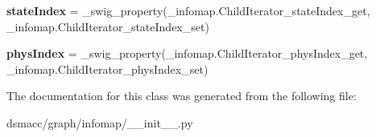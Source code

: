 \begin{DoxyCompactItemize}
{\bfseries state\+Index} = \+\_\+swig\+\_\+property(\+\_\+infomap.\+Child\+Iterator\+\_\+state\+Index\+\_\+get, \+\_\+infomap.\+Child\+Iterator\+\_\+state\+Index\+\_\+set)
\item 
\mbox{\label{classdsmacc_1_1graph_1_1infomap_1_1ChildIterator_a0714909f9405f1c27f3c367baf4a9331}} 
{\bfseries phys\+Index} = \+\_\+swig\+\_\+property(\+\_\+infomap.\+Child\+Iterator\+\_\+phys\+Index\+\_\+get, \+\_\+infomap.\+Child\+Iterator\+\_\+phys\+Index\+\_\+set)
\end{DoxyCompactItemize}


The documentation for this class was generated from the following file\+:\begin{DoxyCompactItemize}
\item 
dsmacc/graph/infomap/\+\_\+\+\_\+init\+\_\+\+\_\+.\+py\end{DoxyCompactItemize}
